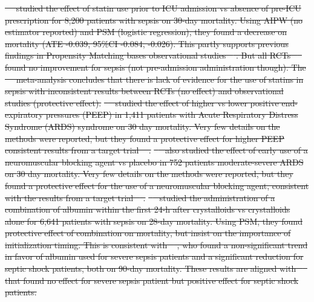 \documentclass[10pt,letterpaper]{article}
\providecommand{\DIFdeltex}[1]{{\protect\color{red}\sout{#1}}}                      %
\providecommand{\DIFdelbegin}{} %
\providecommand{\DIFdel}[1]{\texorpdfstring{\DIFdeltex{#1}}{}} %
\newcommand{\DIFscaledelfig}{0.5}
\newlength{\DIFdelgraphicswidth} %
\newlength{\DIFdelgraphicsheight} %
\newcommand{\DIFdelincludegraphics}[2][]{%
\sbox{\DIFdelgraphicsbox}{\DIFOincludegraphics[#1]{#2}}%
\settoboxwidth{\DIFdelgraphicswidth}{\DIFdelgraphicsbox} %
\settoboxtotalheight{\DIFdelgraphicsheight}{\DIFdelgraphicsbox} %
\scalebox{\DIFscaledelfig}{%
\parbox[b]{\DIFdelgraphicswidth}{\usebox{\DIFdelgraphicsbox}\\[-\baselineskip] \rule{\DIFdelgraphicswidth}{0em}}\llap{\resizebox{\DIFdelgraphicswidth}{\DIFdelgraphicsheight}{%
\setlength{\unitlength}{\DIFdelgraphicswidth}%
\begin{picture}(1,1)%
\thicklines\linethickness{2pt} %
{\color[rgb]{1,0,0}\put(0,0){\framebox(1,1){}}}%
{\color[rgb]{1,0,0}\put(0,0){\line( 1,1){1}}}%
{\color[rgb]{1,0,0}\put(0,1){\line(1,-1){1}}}%
\end{picture}%
}\hspace*{3pt}}} %
} %
\DeclareRobustCommand{\DIFdelbegin}{\DIFOdelbegin \let\includegraphics\DIFdelincludegraphics} %
\begin{document}
\DIFdelbegin %
\DIFdel{\mbox{%
    \cite{chinaeke2021impact} }\hskip0pt%
  studied the effect of \textcolor{I}{statin use
    prior to ICU admission} vs \textcolor{C}{absence of pre-ICU
    prescription} for \textcolor{P}{8,200 patients with sepsis} on
  \textcolor{O}{30-day mortality}. Using AIPW (no estimator reported)
  and PSM (logistic regression), they found a decrease on mortality (ATE
  -0.039, 95\%CI -0.084, -0.026). This partly supports previous
  findings in Propensity Matching bases observational studies
  \mbox{%
    \cite{lee2017preadmission,kyu2019preadmission}}\hskip0pt%
  . But all RCTs
  \mbox{%
    \cite{national2014rosuvastatin,singh2017effects} }\hskip0pt%
  found no improvement for sepsis (not
  pre-admission administration though). The \mbox{%
    \cite{wan2014effect}
  }\hskip0pt%
  meta-analysis concludes that there is lack of evidence for the use of
  statins in sepsis with inconsistent results between RCTs (no effect)
  and observational studies (protective effect).
}%
\DIFdel{\mbox{%
    \cite{adibuzzaman2019323} }\hskip0pt%
  studied the effect of \textcolor{I}{higher} vs
  \textcolor{C}{lower positive end-expiratory pressures (PEEP)} in
  \textcolor{P}{1,411 patients with Acute Respiratory Distress Syndrome
    (ARDS) syndrome} on \textcolor{O}{30 day mortality}. Very few details on
  the methods were reported, but they found a protective effect for higher PEEP
  consistent results from a target trial \mbox{%
    \cite{national2004higher}}\hskip0pt%
  .
}%
\DIFdel{\mbox{%
    \cite{adibuzzaman2019323} }\hskip0pt%
  also studied the effect of \textcolor{I}{early
    use of a neuromuscular blocking agent } vs \textcolor{C}{placebo} in
  \textcolor{P}{752 patients moderate-severe ARDS} on \textcolor{O}{30
    day mortality}. Very few details on the methods were reported, but they found a
  protective effect for the use of a neuromuscular blocking agent,
  consistent with the results from a target trial
  \mbox{%
    \cite{papazian2010neuromuscular}}\hskip0pt%
  .
}%
\DIFdel{\mbox{%
    \cite{zhou2021early} }\hskip0pt%
  studied the administration of \textcolor{I}{a
    combination of albumin within the first 24-h after crystalloids} vs
  \textcolor{C}{crystalloids alone} for \textcolor{P}{6,641 patients
    with sepsis} on \textcolor{O}{28-day mortality}. Using PSM, they found
  protective effect of combination on mortality, but insist on the
  importance of initialization timing. This is consistent with \mbox{%
    \cite{xu2014comparison}}\hskip0pt%
  , who
  found a non-significant trend
  in favor of albumin used for severe sepsis patients and a significant
  reduction for septic shock patients, both on 90-day mortality. These
  results are aligned with \mbox{%
    \cite{caironi2014albumin} }\hskip0pt%
  that found no effect
  for severe sepsis patient but positive effect for septic shock patients.
}%
\end{document}
